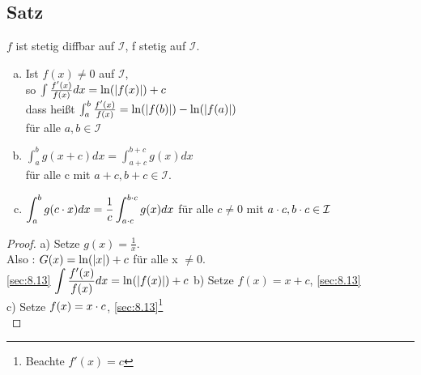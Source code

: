\subsection[Satz:]{Satz}
$f$ ist stetig diffbar auf $\mathcal{I}$, f stetig auf $\mathcal{I}$.\\
\begin{enumerate}[a)]
\item Ist $f(x) \ne 0$ auf $\mathcal{I}$,\\
so $\int \frac{f'(x)}{f(x)}dx = \ln(\lvert f(x) \rvert) + c$\\
dass hei\ss t $\int_{a}^{b} \frac{f'(x)}{f(x)} = \ln(\lvert f(b) \rvert) - \ln(\lvert f(a) \rvert)$\\
für alle $a,b \in \mathcal{I}$
\item ${\displaystyle \int_{a}^{b} g(x + c)dx = \int_{a+c}^{b+c} g(x)dx}$\\
für alle c mit $a+c, b+c \in \mathcal{I}$.\\
\item ${\displaystyle \int_{a}^{b} g(c \cdot x)dx = \frac{1}{c}\int_{a \cdot c}^{b \cdot c}g(x)dx}$ für alle $c \ne 0 $ mit $a\cdot c, b\cdot c\in \mathcal{I}$\\
\end{enumerate}
\begin{proof}
a) Setze $g(x)= \frac{1}{x}$.\\
Also : $G(x) = \ln(\lvert x \rvert) + c$ für alle x $\ne 0$.\\
\ref{sec:8.13} ${\displaystyle \int \frac{f'(x)}{f(x)}dx} = \ln(\lvert f(x) \rvert) + c$
b) Setze $f(x) = x + c$, \ref{sec:8.13}\\
c) Setze $f(x) = x \cdot c$, \ref{sec:8.13}\footnote{Beachte $f'(x)=c$}\\
\end{proof}
